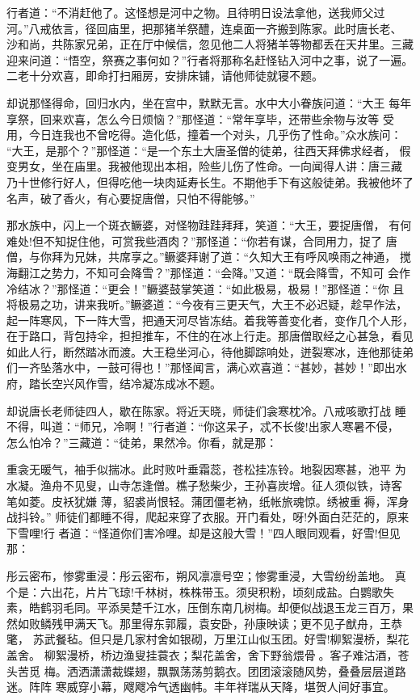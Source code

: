 行者道：“不消赶他了。这怪想是河中之物。且待明日设法拿他，送我师父过
河。”八戒依言，径回庙里，把那猪羊祭醴，连桌面一齐搬到陈家。此时唐长老、
沙和尚，共陈家兄弟，正在厅中候信，忽见他二人将猪羊等物都丢在天井里。三藏
迎来问道：“悟空，祭赛之事何如？”行者将那称名赶怪钻入河中之事，说了一遍。
二老十分欢喜，即命打扫厢房，安排床铺，请他师徒就寝不题。

却说那怪得命，回归水内，坐在宫中，默默无言。水中大小眷族问道：“大王
每年享祭，回来欢喜，怎么今日烦恼？”那怪道：“常年享毕，还带些余物与汝等
受用，今日连我也不曾吃得。造化低，撞着一个对头，几乎伤了性命。”众水族问：
“大王，是那个？”那怪道：“是一个东土大唐圣僧的徒弟，往西天拜佛求经者，
假变男女，坐在庙里。我被他现出本相，险些儿伤了性命。一向闻得人讲：唐三藏
乃十世修行好人，但得吃他一块肉延寿长生。不期他手下有这般徒弟。我被他坏了
名声，破了香火，有心要捉唐僧，只怕不得能够。”

那水族中，闪上一个斑衣鳜婆，对怪物跬跬拜拜，笑道：“大王，要捉唐僧，
有何难处!但不知捉住他，可赏我些酒肉？”那怪道：“你若有谋，合同用力，捉了
唐僧，与你拜为兄妹，共席享之。”鳜婆拜谢了道：“久知大王有呼风唤雨之神通，
搅海翻江之势力，不知可会降雪？”那怪道：“会降。”又道：“既会降雪，不知可
会作冷结冰？”那怪道：“更会！”鳜婆鼓掌笑道：“如此极易，极易！”那怪道：“你
且将极易之功，讲来我听。”鳜婆道：“今夜有三更天气，大王不必迟疑，趁早作法，
起一阵寒风，下一阵大雪，把通天河尽皆冻结。着我等善变化者，变作几个人形，
在于路口，背包持伞，担担推车，不住的在冰上行走。那唐僧取经之心甚急，看见
如此人行，断然踏冰而渡。大王稳坐河心，待他脚踪响处，迸裂寒冰，连他那徒弟
们一齐坠落水中，一鼓可得也！”那怪闻言，满心欢喜道：“甚妙，甚妙！”即出水
府，踏长空兴风作雪，结冷凝冻成冰不题。

却说唐长老师徒四人，歇在陈家。将近天晓，师徒们衾寒枕冷。八戒咳歌打战
睡不得，叫道：“师兄，冷啊！”行者道：“你这呆子，忒不长俊!出家人寒暑不侵，
怎么怕冷？”三藏道：“徒弟，果然冷。你看，就是那：

重衾无暖气，袖手似揣冰。此时败叶垂霜蕊，苍松挂冻铃。地裂因寒甚，池平
为水凝。渔舟不见叟，山寺怎逢僧。樵子愁柴少，王孙喜炭增。征人须似铁，诗客
笔如菱。皮袄犹嫌
薄，貂裘尚恨轻。蒲团僵老衲，纸帐旅魂惊。绣被重褥，浑身战抖铃。”
师徒们都睡不得，爬起来穿了衣服。开门看处，呀!外面白茫茫的，原来下雪哩!行
者道：“怪道你们害冷哩。却是这般大雪！”四人眼同观看，好雪!但见那：

彤云密布，惨雾重浸：彤云密布，朔风凛凛号空；惨雾重浸，大雪纷纷盖地。
真个是：六出花，片片飞琼!千林树，株株带玉。须臾积粉，顷刻成盐。白鹦歌失
素，皓鹤羽毛同。平添吴楚千江水，压倒东南几树梅。却便似战退玉龙三百万，果
然如败鳞残甲满天飞。那里得东郭履，袁安卧，孙康映读；更不见子猷舟，王恭氅，
苏武餐毡。但只是几家村舍如银砌，万里江山似玉团。好雪!柳絮漫桥，梨花盖舍。
柳絮漫桥，桥边渔叟挂蓑衣；梨花盖舍，舍下野翁煨骨。客子难沽酒，苍头苦觅
梅。洒洒潇潇裁蝶翅，飘飘荡荡剪鹅衣。团团滚滚随风势，叠叠层层道路迷。阵阵
寒威穿小幕，飕飕冷气透幽帏。丰年祥瑞从天降，堪贺人间好事宜。

